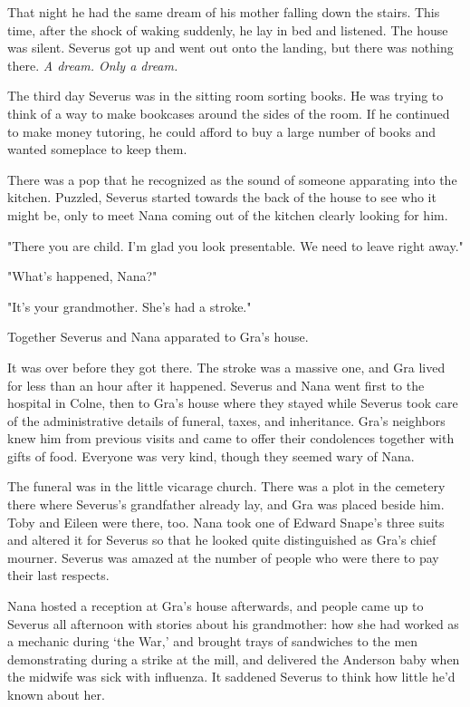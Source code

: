 \documentclass[a4paper,11pt]{article}
\begin{document}
That night he had the same dream of his mother falling down the stairs. This time, after the shock of waking suddenly, he lay in bed and listened. The house was silent. Severus got up and went out onto the landing, but there was nothing there. \emph{A dream. Only a dream.}

The third day Severus was in the sitting room sorting books. He was trying to think of a way to make bookcases around the sides of the room. If he continued to make money tutoring, he could afford to buy a large number of books and wanted someplace to keep them.

There was a pop that he recognized as the sound of someone apparating into the kitchen. Puzzled, Severus started towards the back of the house to see who it might be, only to meet Nana coming out of the kitchen clearly looking for him.

"There you are child. I'm glad you look presentable. We need to leave right away."

"What's happened, Nana?"

"It's your grandmother. She's had a stroke."

Together Severus and Nana apparated to Gra's house.

It was over before they got there. The stroke was a massive one, and Gra lived for less than an hour after it happened. Severus and Nana went first to the hospital in Colne, then to Gra's house where they stayed while Severus took care of the administrative details of funeral, taxes, and inheritance. Gra's neighbors knew him from previous visits and came to offer their condolences together with gifts of food. Everyone was very kind, though they seemed wary of Nana.

The funeral was in the little vicarage church. There was a plot in the cemetery there where Severus's grandfather already lay, and Gra was placed beside him. Toby and Eileen were there, too. Nana took one of Edward Snape's three suits and altered it for Severus so that he looked quite distinguished as Gra's chief mourner. Severus was amazed at the number of people who were there to pay their last respects.

Nana hosted a reception at Gra's house afterwards, and people came up to Severus all afternoon with stories about his grandmother: how she had worked as a mechanic during `the War,' and brought trays of sandwiches to the men demonstrating during a strike at the mill, and delivered the Anderson baby when the midwife was sick with influenza. It saddened Severus to think how little he'd known about her.
\end{document}

